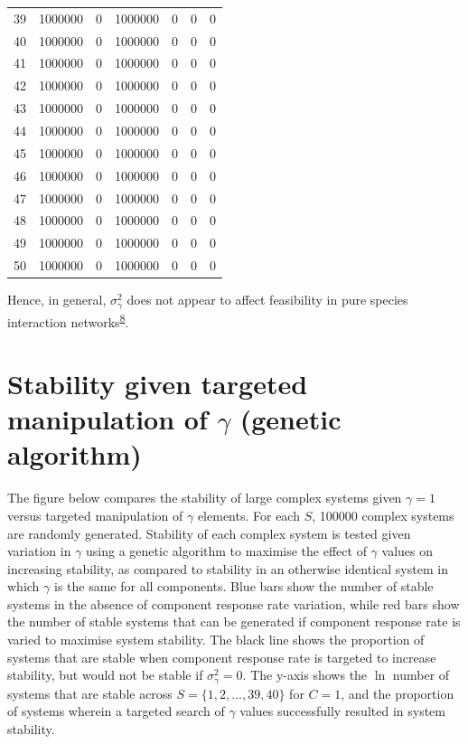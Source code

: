 \documentclass[]{article}
\begin{document}
\begin{longtable}[]{@{}rrrrrrr@{}}
39 & 1000000 & 0 & 1000000 & 0 & 0 & 0\tabularnewline
40 & 1000000 & 0 & 1000000 & 0 & 0 & 0\tabularnewline
41 & 1000000 & 0 & 1000000 & 0 & 0 & 0\tabularnewline
42 & 1000000 & 0 & 1000000 & 0 & 0 & 0\tabularnewline
43 & 1000000 & 0 & 1000000 & 0 & 0 & 0\tabularnewline
44 & 1000000 & 0 & 1000000 & 0 & 0 & 0\tabularnewline
45 & 1000000 & 0 & 1000000 & 0 & 0 & 0\tabularnewline
46 & 1000000 & 0 & 1000000 & 0 & 0 & 0\tabularnewline
47 & 1000000 & 0 & 1000000 & 0 & 0 & 0\tabularnewline
48 & 1000000 & 0 & 1000000 & 0 & 0 & 0\tabularnewline
49 & 1000000 & 0 & 1000000 & 0 & 0 & 0\tabularnewline
50 & 1000000 & 0 & 1000000 & 0 & 0 & 0\tabularnewline
\bottomrule
\end{longtable}

Hence, in general, \(\sigma^{2}_{\gamma}\) does not appear to affect
feasibility in pure species interaction
networks\textsuperscript{\protect\hyperlink{ref-Servan2018}{8}}.

\hypertarget{ga}{\section{\texorpdfstring{Stability given targeted
manipulation of \(\gamma\) (genetic
algorithm)}{Stability given targeted manipulation of \textbackslash{}gamma (genetic algorithm)}}\label{ga}}

The figure below compares the stability of large complex systems given
\(\gamma = 1\) versus targeted manipulation of \(\gamma\) elements. For
each \(S\), 100000 complex systems are randomly generated. Stability of
each complex system is tested given variation in \(\gamma\) using a
genetic algorithm to maximise the effect of \(\gamma\) values on
increasing stability, as compared to stability in an otherwise identical
system in which \(\gamma\) is the same for all components. Blue bars
show the number of stable systems in the absence of component response
rate variation, while red bars show the number of stable systems that
can be generated if component response rate is varied to maximise system
stability. The black line shows the proportion of systems that are
stable when component response rate is targeted to increase stability,
but would not be stable if \(\sigma^{2}_{\gamma} = 0\). The y-axis shows
the \(\ln\) number of systems that are stable across
\(S = \{1, 2, ..., 39, 40\}\) for \(C = 1\), and the proportion of
systems wherein a targeted search of \(\gamma\) values successfully
resulted in system stability.
\end{document}
